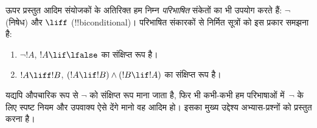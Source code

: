 \documentclass[../../../include/open-logic-section]{subfiles}
\begin{document}
ऊपर प्रस्तुत आदिम संयोजकों के अतिरिक्त हम निम्न \emph{परिभाषित} संकेतों का
भी उपयोग करते हैं: $\lnot$ (निषेध) और $\liff$ (!!{biconditional})। परिभाषित
संकारकों से निर्मित सूत्रों को इस प्रकार समझना है:
\begin{enumerate}
\item $\lnot !A$, $!A \lif \lfalse$ का संक्षिप्त रूप है।

\item $!A \liff !B$, $(!A \lif !B) \land (!B \lif !A)$ का संक्षिप्त
  रूप है।
\end{enumerate}

यद्यपि औपचारिक रूप से $\lnot$ को संक्षिप्त रूप माना जाता है, फिर भी कभी-कभी
हम परिभाषाओं में~$\lnot$ के लिए स्पष्ट नियम और उपवाक्य ऐसे देंगे मानो वह
आदिम हो। इसका मुख्य उद्देश्य अभ्यास-प्रश्नों को प्रस्तुत करना है।
\end{document}

